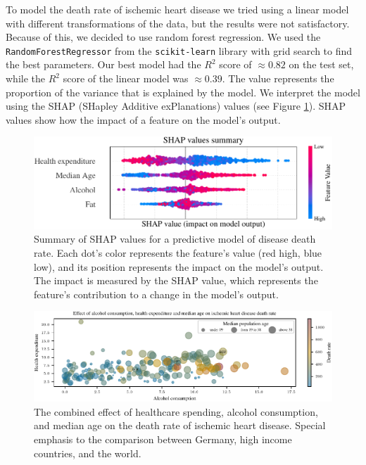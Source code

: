 

To model the death rate of ischemic heart disease we tried using a linear model with different transformations of the data, but the results were not satisfactory.
Because of this, we decided to use random forest regression. 
We used the \texttt{RandomForestRegressor} from the \texttt{scikit-learn} library \citep{scikit-learn} with grid search to find the best parameters. Our best model had the 
$R^2$ score of $\approx0.82$ on the test set, while the $R^2$ score of the linear model was $\approx0.39$. The value represents the proportion of the variance that 
is explained by the model. We interpret the model using the SHAP (SHapley Additive exPlanations) values \citep{NIPS2017_7062} (see Figure \ref{shap_values}). SHAP values 
show how the impact of a feature on the model's output. 
\begin{figure}[ht]
    \vskip 0.2in
    \begin{center}
    \centerline{\includegraphics[width=\columnwidth]{fig/fig_shap_values_summary.pdf}}
    \caption{Summary of SHAP values for a predictive model of disease death rate. 
    Each dot's color represents the feature's value (red high, blue low), and its position represents the impact on the model's output.
    The impact is measured by the SHAP value, which represents the feature's contribution to a change in the model's output.}
    \label{shap_values}
    \end{center}
    \vskip -0.2in
\end{figure}

\begin{figure}[ht]
    \vskip 0.2in
    \centering
    \centerline{\includegraphics[]{fig/fig_bubble_plot_factors.pdf}}
    \caption{The combined effect of healthcare spending, alcohol consumption, and median age on the death rate of ischemic heart disease. Special 
        emphasis to the comparison between Germany, high income countries, and the world.}
    \label{bubble_plot_factors}
\end{figure}

